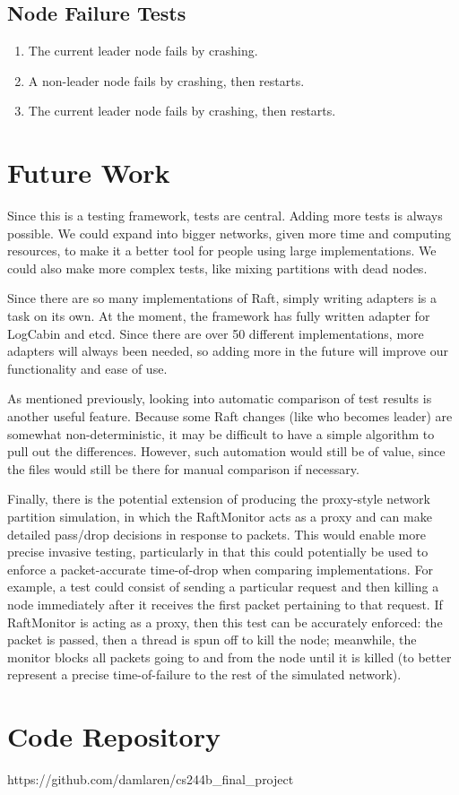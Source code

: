 \documentclass[UTF8]{article}
\begin{document}
\subsection{Node Failure Tests}
\begin{enumerate}
  \item The current leader node fails by crashing.
  \item A non-leader node fails by crashing, then restarts.
  \item The current leader node fails by crashing, then restarts. 
\end{enumerate}

\section{Future Work}
Since this is a testing framework, tests are central. Adding more tests is always possible. We could expand into bigger networks, given more time and computing resources, to make it a better tool for people using large implementations. We could also make more complex tests, like mixing partitions with dead nodes.

Since there are so many implementations of Raft, simply writing adapters is a task on its own. At the moment, the framework has fully written adapter for LogCabin and etcd. Since there are over 50 different implementations, more adapters will always been needed, so adding more in the future will improve our functionality and ease of use.

As mentioned previously, looking into automatic comparison of test results is another useful feature. Because some Raft changes (like who becomes leader) are somewhat non-deterministic, it may be difficult to have a simple algorithm to pull out the differences. However, such automation would still be of value, since the files would still be there for manual comparison if necessary.

Finally, there is the potential extension of producing the proxy-style network partition simulation, in which the RaftMonitor acts as a proxy and can make detailed pass/drop decisions in response to packets. This would enable more precise invasive testing, particularly in that this could potentially be used to enforce a packet-accurate time-of-drop when comparing implementations. For example, a test could consist of sending a particular request and then killing a node immediately after it receives the first packet pertaining to that request. If RaftMonitor is acting as a proxy, then this test can be accurately enforced: the packet is passed, then a thread is spun off to kill the node; meanwhile, the monitor blocks all packets going to and from the node until it is killed (to better represent a precise time-of-failure to the rest of the simulated network).

\section{Code Repository}
https://github.com/damlaren/cs244b\_final\_project



\end{document}
